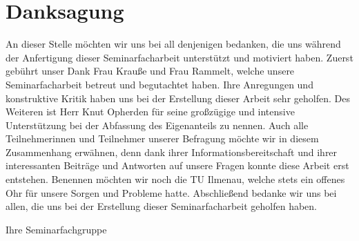 \chapter{Danksagung}

An dieser Stelle möchten wir uns bei all denjenigen bedanken, die uns während der Anfertigung dieser Seminarfacharbeit unterstützt und motiviert haben.
Zuerst gebührt unser Dank Frau Krauße und Frau Rammelt, welche unsere Seminarfacharbeit betreut und begutachtet haben. Ihre Anregungen und konstruktive Kritik haben uns bei der Erstellung dieser Arbeit sehr geholfen.
Des Weiteren ist Herr Knut Opherden für seine großzügige und intensive Unterstützung bei der Abfassung des Eigenanteils zu nennen.
Auch alle Teilnehmerinnen und Teilnehmer unserer Befragung möchte wir in diesem Zusammenhang erwähnen, denn dank ihrer Informationsbereitschaft und ihrer interessanten Beiträge und Antworten auf unsere Fragen konnte diese Arbeit erst entstehen.
Benennen möchten wir noch die TU Ilmenau, welche stets ein offenes Ohr für unsere Sorgen und Probleme hatte.
Abschließend bedanke wir uns bei allen, die uns bei der Erstellung dieser Seminarfacharbeit geholfen haben.

\vspace{5cm}
Ihre Seminarfachgruppe